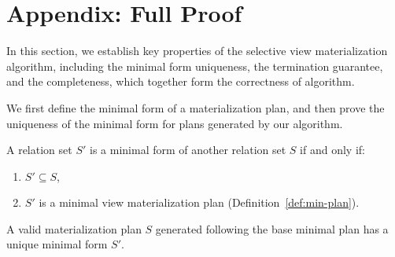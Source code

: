 \section{Appendix: Full Proof}
\label{sec-appendix}

In this section, we establish key properties of the selective view materialization algorithm, including the minimal form uniqueness, the termination guarantee, and the completeness, which together form the correctness of \proto algorithm.

\medskip {}
We first define the minimal form of a materialization plan, and then prove the uniqueness of the minimal form for plans generated by our algorithm.

\begin{deff}
A relation set $S'$ is a minimal form of another relation set $S$ if and only if:
\begin{enumerate}
    \item 
    $S' \subseteq S$, 
    \item
    $S'$ is a minimal view materialization plan (Definition~\ref{def:min-plan}).
\end{enumerate}
\end{deff}

\begin{lmm}\label{lemma:uniqness}
    A valid materialization plan $S$ generated following the base minimal plan has a unique minimal form $S'$.
\end{lmm}

